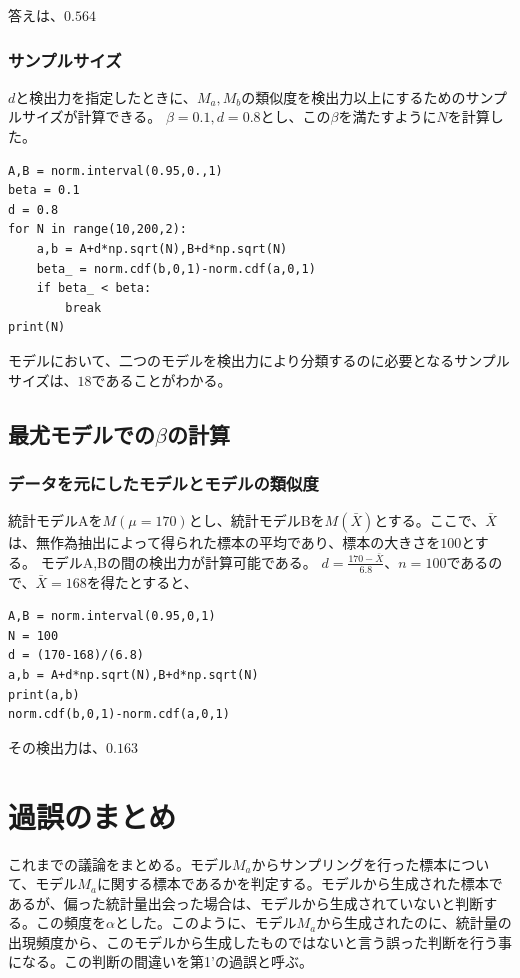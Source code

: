 答えは、$0.564$


\subsubsection{サンプルサイズ}
$d$と検出力を指定したときに、$M_a,M_b$の類似度を検出力以上にするためのサンプルサイズが計算できる。
$\beta=0.1,d=0.8$とし、この$\beta$を満たすように$N$を計算した。

\begin{lstlisting}
A,B = norm.interval(0.95,0.,1)
beta = 0.1
d = 0.8
for N in range(10,200,2):
    a,b = A+d*np.sqrt(N),B+d*np.sqrt(N)
    beta_ = norm.cdf(b,0,1)-norm.cdf(a,0,1)
    if beta_ < beta:
        break
print(N)
\end{lstlisting}
モデルにおいて、二つのモデルを検出力により分類するのに必要となるサンプルサイズは、$18$であることがわかる。




\subsection{最尤モデルでの$\beta$の計算}
\subsubsection{データを元にしたモデルとモデルの類似度}
統計モデルAを$M(\mu=170)$とし、統計モデルBを$M(\bar{X})$とする。ここで、$\bar{X}$は、無作為抽出によって得られた標本の平均であり、標本の大きさを$100$とする。
モデルA,Bの間の検出力が計算可能である。
$d=\frac{170-\bar{X}}{6.8}$、$n=100$であるので、$\bar{X}=168$を得たとすると、
\begin{lstlisting}
A,B = norm.interval(0.95,0,1)
N = 100
d = (170-168)/(6.8)
a,b = A+d*np.sqrt(N),B+d*np.sqrt(N)
print(a,b)
norm.cdf(b,0,1)-norm.cdf(a,0,1)
\end{lstlisting}
その検出力は、$0.163$


\section{過誤のまとめ}
これまでの議論をまとめる。モデル$M_a$からサンプリングを行った標本について、モデル$M_a$に関する標本であるかを判定する。モデルから生成された標本であるが、偏った統計量出会った場合は、モデルから生成されていないと判断する。この頻度を$\alpha$とした。このように、モデル$M_a$から生成されたのに、統計量の出現頻度から、このモデルから生成したものではないと言う誤った判断を行う事になる。この判断の間違いを第1'の過誤と呼ぶ。

